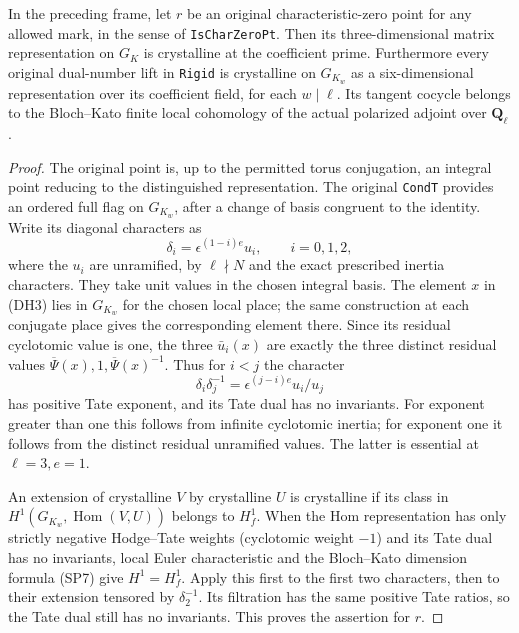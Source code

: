\begin{theorem}
\label{thm:rh-dyadic-host-crystalline}
In the preceding frame, let $r$ be an original characteristic-zero
point for any allowed mark, in the sense of \texttt{IsCharZeroPt}.
Then its three-dimensional matrix representation on $G_K$
is crystalline at the coefficient prime.  Furthermore every
original dual-number lift in \texttt{Rigid} is crystalline on
$G_{K_w}$ as a six-dimensional representation over its coefficient
field, for each $w\mid\ell$.  Its tangent cocycle belongs to the
Bloch--Kato finite local cohomology of the actual polarized adjoint
over $\mathbf Q_\ell$.
\end{theorem}

\begin{proof}
The original point is, up to the permitted torus conjugation,
an integral point reducing to the distinguished representation.
The original \texttt{CondT} provides an ordered full flag on
$G_{K_w}$, after a change of basis congruent to the identity.
Write its diagonal characters as
\[
         \delta_i=\epsilon^{(1-i)e}u_i,\qquad i=0,1,2,
\]
where the $u_i$ are unramified, by $\ell\nmid N$ and the
exact prescribed inertia characters.  They take unit values
in the chosen integral basis.  The element $x$ in (DH3) lies
in $G_{K_w}$ for the chosen local place; the same construction
at each conjugate place gives the corresponding element there.
Since its residual cyclotomic value is one, the three
$\bar u_i(x)$ are exactly the three distinct residual values
$\overline\Psi(x),1,\overline\Psi(x)^{-1}$.
Thus for $i<j$ the character
\[
                      \delta_i\delta_j^{-1}
                    =\epsilon^{(j-i)e}u_i/u_j
\]
has positive Tate exponent, and its Tate dual has no invariants.
For exponent greater than one this follows from infinite
cyclotomic inertia; for exponent one it follows from the
distinct residual unramified values.  The latter is essential
at $\ell=3,e=1$.

An extension of crystalline $V$ by crystalline $U$ is crystalline
if its class in $H^1(G_{K_w},\operatorname{Hom}(V,U))$ belongs
to $H_f^1$.  When the Hom representation has only strictly
negative Hodge--Tate weights (cyclotomic weight $-1$) and its
Tate dual has no invariants, local Euler characteristic and
the Bloch--Kato dimension formula (SP7) give $H^1=H_f^1$.
Apply this first to the first two characters, then to their
extension tensored by $\delta_2^{-1}$.  Its filtration has the
same positive Tate ratios, so the Tate dual still has no
invariants.  This proves the assertion for $r$.


\end{proof}
